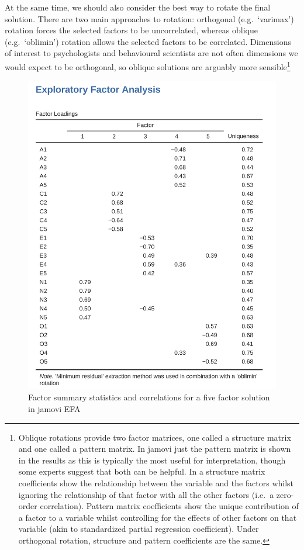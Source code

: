 \documentclass[
  a4paper,
]{book}
\begin{document}
At the same time, we should also consider the best way to rotate the
final solution. There are two main approaches to rotation: orthogonal
(e.g.~`varimax') rotation forces the selected factors to be
uncorrelated, whereas oblique (e.g.~`oblimin') rotation allows the
selected factors to be correlated. Dimensions of interest to
psychologists and behavioural scientists are not often dimensions we
would expect to be orthogonal, so oblique solutions are arguably more
sensible\footnote{Oblique rotations provide two factor matrices, one
  called a structure matrix and one called a pattern matrix. In jamovi
  just the pattern matrix is shown in the results as this is typically
  the most useful for interpretation, though some experts suggest that
  both can be helpful. In a structure matrix coefficients show the
  relationship between the variable and the factors whilst ignoring the
  relationship of that factor with all the other factors (i.e.~a
  zero-order correlation). Pattern matrix coefficients show the unique
  contribution of a factor to a variable whilst controlling for the
  effects of other factors on that variable (akin to standardized
  partial regression coefficient). Under orthogonal rotation, structure
  and pattern coefficients are the same.}

\begin{figure}

\includegraphics[width=1\textwidth,height=\textheight]{images/fig15-6.png} \hfill{}

\caption{\label{fig-fig15-6}Factor summary statistics and correlations
for a five factor solution in jamovi EFA}

\end{figure}
\end{document}
